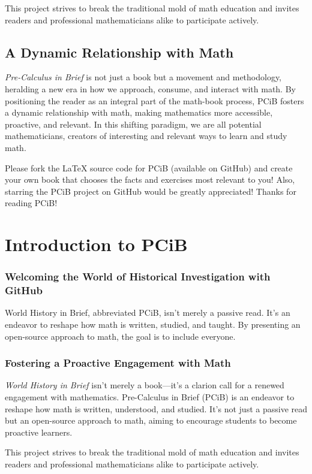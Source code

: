 \documentclass[a4paper,12pt]{book}
\begin{document}
This project strives to break the traditional mold of math education and invites readers and professional mathematicians alike to participate actively.

\section*{A Dynamic Relationship with Math}
\emph{Pre-Calculus in Brief} is not just a book but a movement and methodology, heralding a new era in how we approach, consume, and interact with math. By positioning the reader as an integral part of the math-book process, PCiB fosters a dynamic relationship with math, making mathematics more accessible, proactive, and relevant. In this shifting paradigm, we are all potential mathematicians, creators of interesting and relevant ways to learn and study math.

Please fork the LaTeX source code for PCiB (available on GitHub) and create your own book that chooses the facts and exercises most relevant to you! Also, starring the PCiB project on GitHub would be greatly appreciated! Thanks for reading PCiB!

\chapter{Introduction to PCiB}
\subsection*{Welcoming the World of Historical Investigation with GitHub}
World History in Brief, abbreviated PCiB, isn't merely a passive read. It's an endeavor to reshape how math is written, studied, and taught. By presenting an open-source approach to math, the goal is to include everyone. 

\subsection*{Fostering a Proactive Engagement with Math}

\emph{World History in Brief} isn't merely a book—it's a clarion call for a renewed engagement with mathematics. Pre-Calculus in Brief (PCiB) is an endeavor to reshape how math is written, understood, and studied. It's not just a passive read but an open-source approach to math, aiming to encourage students to become proactive learners.

This project strives to break the traditional mold of math education and invites readers and professional mathematicians alike to participate actively.
\end{document}

